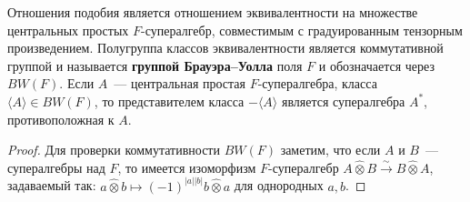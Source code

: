 \documentclass[a4paper,oneside,12pt]{article}
\theoremstyle{plain} { \swapnumbers
\newtheorem{theorem}{Теорема}[subsection]
\newtheorem{corollary}[theorem]{Следствие}
\newtheorem{lemma}[theorem]{Лемма}
\newtheorem{proposition}[theorem]{Утверждение}
\newtheorem{claim}[theorem]{Факт}
}
\theoremstyle{definition} { \swapnumbers
\newtheorem{definition}[theorem]{Определение}
\newtheorem{notation}[theorem]{Обозначение}
\newtheorem{remark}[theorem]{Замечание}
\newtheorem{remarks}[theorem]{Замечания}
\newtheorem{example}[theorem]{Пример}
\newtheorem{examples}[theorem]{Примеры}
\newtheorem{sssection}[theorem]{}
}
\def\la{\langle}
\def\ra{\rangle}
\begin{document}
\begin{theorem}
Отношения подобия является отношением эквивалентности на множестве центральных простых
$F$-супералгебр, совместимым с градуированным тензорным произведением. Полугруппа
классов эквивалентности является коммутативной группой и называется
{\bf группой Брауэра--Уолла} поля $F$ и обозначается через $BW(F)$.
Если $A$~--- центральная простая $F$-супералгебра, класса $\la A\ra\in BW(F)$,
то представителем класса $-\la A\ra$ является супералгебра $A^*$, противоположная к $A$.
\end{theorem}
\begin{proof}
Для проверки коммутативности $BW(F)$ заметим, что если $A$ и $B$~--- супералгебры над $F$,
то имеется изоморфизм $F$-супералгебр $A\hat\otimes B\stackrel{\sim}{\longrightarrow}B\hat\otimes A$,
задаваемый так: $a\hat\otimes b\mapsto (-1)^{|a||b|}b\hat\otimes a$ для однородных $a,b$.
\end{proof}
\end{document}
